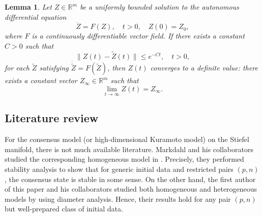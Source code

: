 \documentclass[11pt,reqno]{amsart}
\numberwithin{figure}{section}
\newcommand{\bbr}{\mathbb R}
\newcommand{\bbz}{\mathbb Z}
\newtheorem{lemma}{Lemma}[section]
\begin{document}
\begin{lemma} \label{conv} \cite{H-R16,K24}
	Let $Z\in \bbr^m$ be a uniformly bounded solution to the  autonomous differential equation
	\begin{equation}\label{A-50}
	\dot Z = F(Z),\quad t>0,\quad Z(0) =Z_0,
	\end{equation} 
	where $F$ is a continuously differentiable vector field. If there exists a constant  $C>0$  such that 
	\begin{equation*} \label{A-51}
	\|Z(t) - \tilde Z(t) \| \leq e^{-Ct} ,\quad t>0,
	\end{equation*} 
	for each $\tilde{Z}$ satisfying $\dot{\tilde{Z}}=F(\tilde{Z})$, then $Z(t)$ converges to a definite value: there exists a constant vector $Z_\infty \in \bbr^m$ such that
	\begin{equation} \label{A-52}
	\lim_{t\to\infty} Z(t)= Z_\infty.
	\end{equation} 
\end{lemma}



%


\subsection{Literature review} \label{sec:2.3} 
For the consensus model (or high-dimensional Kuramoto model) on the Stiefel  manifold, there is not much available literature. Markdahl and his collaborators studied the corresponding homogeneous model in \cite{M1,M2}. Precisely, they performed stability analysis to show that for generic initial data and restricted pairs $(p,n)$, the consensus state is stable in some sense. On the other hand, the first author of this paper and his collaborators studied both homogeneous and heterogeneous models by using diameter analysis. Hence, their results hold for any pair $(p,n)$ but well-prepared class of initial data. 
\end{document}
